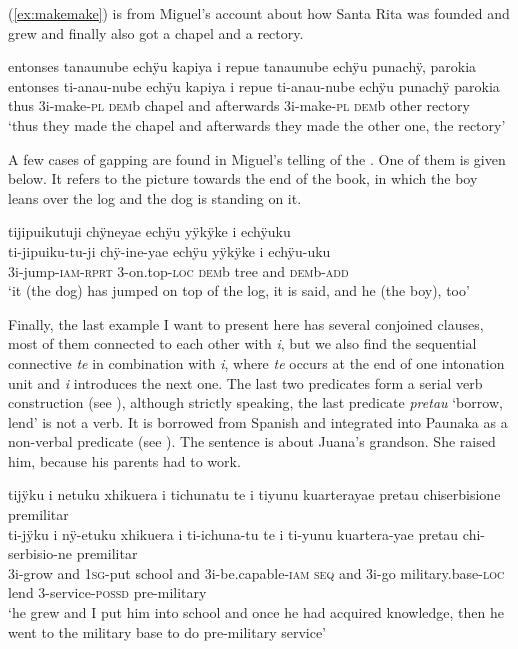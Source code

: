 (\ref{ex:makemake}) is from Miguel’s account about how Santa Rita was founded and grew and finally also got a chapel and a rectory.

\ea\label{ex:makemake}
\begingl
\glpreamble entonses tanaunube echÿu kapiya i repue tanaunube echÿu punachÿ, parokia\\
\gla entonses ti-anau-nube echÿu kapiya i repue ti-anau-nube echÿu punachÿ parokia\\
\glb thus 3i-make-\textsc{pl} \textsc{dem}b chapel and afterwards 3i-make-\textsc{pl} \textsc{dem}b other rectory\\
\glft ‘thus they made the chapel and afterwards they made the other one, the rectory’
\endgl
\trailingcitation{[mxx-p110825l.131]}
\xe

A few cases of gapping are found in Miguel’s telling of the . One of them is given below. It refers to the picture towards the end of the book, in which the boy leans over the log and the dog is standing on it. 

\ea\label{ex:ellipsis}
\begingl
\glpreamble tijipuikutuji chÿneyae echÿu yÿkÿke i echÿuku\\
\gla ti-jipuiku-tu-ji chÿ-ine-yae echÿu yÿkÿke i echÿu-uku\\
\glb 3i-jump-\textsc{iam}-\textsc{rprt} 3-on.top-\textsc{loc} \textsc{dem}b tree and \textsc{dem}b-\textsc{add}\\
\glft ‘it (the dog) has jumped on top of the log, it is said, and he (the boy), too’
\endgl
\trailingcitation{[mtx-a110906l.207-210]}
\xe 

Finally, the last example I want to present here has several conjoined clauses, most of them connected to each other with \textit{i}, but we also find the sequential connective \textit{te} in combination with \textit{i}, where \textit{te} occurs at the end of one intonation unit and \textit{i} introduces the next one. The last two predicates form a serial verb construction (see ), although strictly speaking, the last predicate \textit{pretau} ‘borrow, lend’ is not a verb. It is borrowed from Spanish and integrated into Paunaka as a non-verbal predicate (see ). The sentence is about Juana’s grandson. She raised him, because his parents had to work.

\ea
\begingl
\glpreamble tijÿku i netuku xhikuera i tichunatu te i tiyunu kuarterayae pretau chiserbisione premilitar\\
\gla ti-jÿku i nÿ-etuku xhikuera i ti-ichuna-tu te i ti-yunu kuartera-yae pretau chi-serbisio-ne premilitar\\
\glb 3i-grow and 1\textsc{sg}-put school and 3i-be.capable-\textsc{iam} \textsc{seq} and 3i-go military.base-\textsc{loc} lend 3-service-\textsc{possd} pre-military\\
\glft ‘he grew and I put him into school and once he had acquired knowledge, then he went to the military base to do pre-military service’
\endgl
\trailingcitation{[jxx-p110923l-1.173-178]}
\xe


